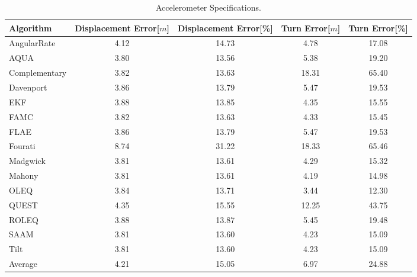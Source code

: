 \begin{table}[H]
    \begin{center}
        \begin{tabular}[t]{lcccc}
            \hline
            Algorithm                   & Displacement Error[$m$] & Displacement Error[\%]      & Turn Error[$m$]  & Turn Error[\%]             \\
            \hline 
            AngularRate            & 4.12  & 14.73 & 4.78 & 17.08              \\            AQUA            & 3.80  & 13.56 & 5.38 & 19.20              \\            Complementary            & 3.82  & 13.63 & 18.31 & 65.40              \\            Davenport            & 3.86  & 13.79 & 5.47 & 19.53              \\            EKF            & 3.88  & 13.85 & 4.35 & 15.55              \\            FAMC            & 3.82  & 13.63 & 4.33 & 15.45              \\            FLAE            & 3.86  & 13.79 & 5.47 & 19.53              \\            Fourati            & 8.74  & 31.22 & 18.33 & 65.46              \\            Madgwick            & 3.81  & 13.61 & 4.29 & 15.32              \\            Mahony            & 3.81  & 13.61 & 4.19 & 14.98              \\            OLEQ            & 3.84  & 13.71 & 3.44 & 12.30              \\            QUEST            & 4.35  & 15.55 & 12.25 & 43.75              \\            ROLEQ            & 3.88  & 13.87 & 5.45 & 19.48              \\            SAAM            & 3.81  & 13.60 & 4.23 & 15.09              \\            Tilt            & 3.81  & 13.60 & 4.23 & 15.09              \\
            \hline
            Average & 4.21 & 15.05 & 6.97 & 24.88
        \end{tabular}
        \caption{Accelerometer Specifications. }
        \label{tab:accelerometer_specification}
    \end{center}
\end{table}